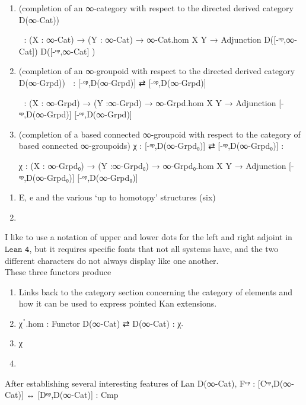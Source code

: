 \documentclass{book}
\theoremstyle{definition}
\begin{document}
\begin{enumerate}
\item (completion of an ∞-category with respect to the directed derived category D(∞-Cat))
\begin{center}
 χ⃗  : (X : ∞-Cat) → (Y : ∞-Cat) → ∞-Cat.hom X Y → Adjunction D([-ᵒᵖ,∞-Cat]) D([-ᵒᵖ,∞-Cat] )
\end{center}
\item (completion of an ∞-groupoid with respect to the directed derived category D(∞-Grpd)) χ⃡ : [-ᵒᵖ,D(∞-Grpd)] ⇄ [-ᵒᵖ,D(∞-Grpd)]
\begin{center}
 χ⃡ : (X : ∞-Grpd) → (Y :∞-Grpd) → ∞-Grpd.hom X Y → Adjunction [-ᵒᵖ,D(∞-Grpd)] [-ᵒᵖ,D(∞-Grpd)]
\end{center}
\item (completion of a based connected ∞-groupoid with respect to the category of based connected ∞-groupoids) χ : [-ᵒᵖ,D(∞-Grpd₀)] ⇄ [-ᵒᵖ,D(∞-Grpd₀)] :
\begin{center}
 χ : (X : ∞-Grpd₀) → (Y :∞-Grpd₀) → ∞-Grpd₀.hom X Y → Adjunction [-ᵒᵖ,D(∞-Grpd₀)] [-ᵒᵖ,D(∞-Grpd₀)]
\end{center}
\end{enumerate}



\begin{enumerate}
\item E, e and the various `up to homotopy' structures (six)
\item 
\end{enumerate}




I like to use a notation of upper and lower dots for the left and right adjoint in $\texttt{Lean 4}$, but it requires specific fonts that not all systems have, and the two different characters do not always display like one another.\\

These three functors produce 

\begin{enumerate}
\item Links back to the category section concerning the category of elements and how it can be used to express pointed Kan extensions.
\item χॱ.hom : Functor D(∞-Cat) ⇄ D(∞-Cat) : χ𛲔
\item χ
\item 
\end{enumerate}

After establishing several interesting features of Lan D(∞-Cat),  Fᵒᵖ : [Cᵒᵖ,D(∞-Cat)] ↔ [Dᵒᵖ,D(∞-Cat)] : Cmp
\end{document}

